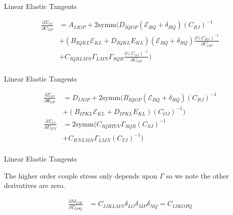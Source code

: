 \documentclass[11pt]{beamer}
\begin{document}
\begin{frame}{Linear Elastic Tangents}


\begin{align*}
\frac{\partial \Sigma_{IJ}}{\partial C_{OP}} &= A_{IJOP} + 2\text{symm}\bigg(D_{IQOP}\left(\mathcal{E}_{RQ} + \delta_{RQ}\right)\left(C_{RJ}\right)^{-1}\\
& + \left(B_{IQKL} \mathcal{E}_{KL} + D_{IQKL} E_{KL}\right)\left(\mathcal{E}_{RQ} + \delta_{RQ}\right) \frac{\partial \left(C_{RJ}\right)^{-1}}{\partial C_{OP}}\\
&+ C_{IQRLMN} \Gamma_{LMN} \Gamma_{SQR} \frac{\partial \left(C_{SJ}\right)^{-1}}{\partial C_{OP}}\bigg)\\
\end{align*}

\end{frame}

\begin{frame}{Linear Elastic Tangents}

\begin{align*}
\frac{\partial \Sigma_{IJ}}{\partial \Psi_{OP}} &= D_{IJOP} + 2\text{symm}\bigg(B_{IQOP} \left(\mathcal{E}_{RQ} + \delta_{RQ}\right) \left(C_{RJ}\right)^{-1}\\
&+ \left(B_{IPKL}\mathcal{E}_{KL} + D_{IPKL}E_{KL}\right)\left(C_{OJ}\right)^{-1}\bigg)\\
\frac{\partial \Sigma_{IJ}}{\partial \Gamma_{TUV}} &= 2\text{symm}\bigg(C_{IQRTUV} \Gamma_{SQR} \left(C_{SJ}\right)^{-1}\\
&+ C_{IUVLMN} \Gamma_{LMN} \left(C_{TJ}\right)^{-1}\bigg)\\
\end{align*}

\end{frame}

\begin{frame}{Linear Elastic Tangents}

The higher order couple stress only depends upon $\Gamma$ so we note the other derivatives are zero.

\begin{align*}
\frac{\partial M_{IJK}}{\partial \Gamma_{OPQ}} &= C_{IJKLMN} \delta_{LO} \delta_{MP} \delta_{NQ} = C_{IJKOPQ}\\
\end{align*}

\end{frame}
\end{document}

